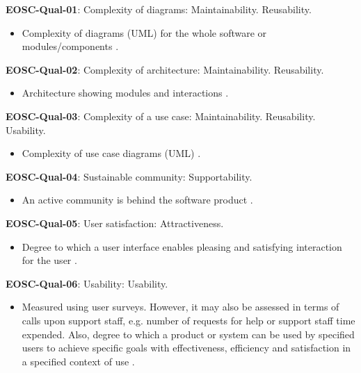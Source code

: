 \textbf{EOSC-Qual-01}: Complexity of diagrams: Maintainability. Reusability.

\begin{itemize}
    \item Complexity of diagrams (UML) for the whole software or modules/components \cite{montagud_systematic_2012}.
\end{itemize}

\textbf{EOSC-Qual-02}: Complexity of architecture: Maintainability. Reusability.

\begin{itemize}
    \item Architecture showing modules and interactions \cite{montagud_systematic_2012,zuser_software_2005}.
\end{itemize}

\textbf{EOSC-Qual-03}: Complexity of a use case: Maintainability. Reusability. Usability.

\begin{itemize}
    \item Complexity of use case diagrams (UML) \cite{montagud_systematic_2012}.
\end{itemize}

\textbf{EOSC-Qual-04}: Sustainable community: Supportability.

\begin{itemize}
    \item An active community is behind the software product \cite{aberdour_achieving_2007}.
\end{itemize}

\textbf{EOSC-Qual-05}: User satisfaction: Attractiveness.

\begin{itemize}
    \item Degree to which a user interface enables pleasing and satisfying interaction for the user \cite{iso_25010_2011_2017,zuser_software_2005}.
\end{itemize}

\textbf{EOSC-Qual-06}: Usability: Usability.

\begin{itemize}
    \item Measured using user surveys. However, it may also be assessed in terms of calls upon support staff, e.g. number of requests for help or support staff time expended. Also, degree to which a product or system can be used by specified users to achieve specific goals with effectiveness, efficiency and satisfaction in a specified context of use \cite{iso_25010_2011_2017,zuser_software_2005,gillies_modelling_1992,boehm_quantitative_1976}.
\end{itemize}

